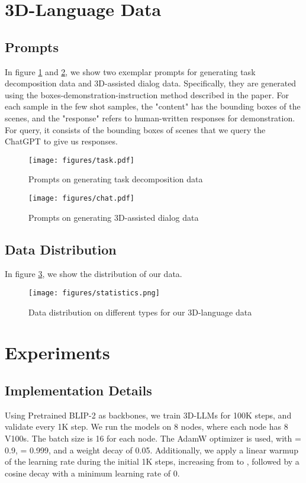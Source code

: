 
\appendix
\setcounter{section}{0}


\section{3D-Language Data}
\subsection{Prompts}
In figure \ref{fig:prompt1} and \ref{fig:prompt2}, we show two exemplar prompts for generating task decomposition data and 3D-assisted dialog data. Specifically, they are generated using the boxes-demonstration-instruction method described in the paper. For each sample in the few shot samples, the "content" has the bounding boxes of the scenes, and the "response" refers to human-written responses for demonstration. For query, it consists of the bounding boxes of scenes that we query the ChatGPT to give us responses. 
\begin{figure}[htbp]
    \centering
    \vspace{-2em}
    \texttt{[image: figures/task.pdf]}
    \caption{Prompts on generating task decomposition data}
    \label{fig:prompt1}
    \vspace{-2em}
\end{figure}
\begin{figure}[htbp]
    \centering
    \texttt{[image: figures/chat.pdf]}
    \caption{Prompts on generating 3D-assisted dialog data}
    \label{fig:prompt2}
\end{figure}

\subsection{Data Distribution}
In figure \ref{fig:data}, we show the distribution of our data.
\begin{figure}[htbp]
    \centering
    \texttt{[image: figures/statistics.png]}
    \caption{Data distribution on different types for our 3D-language data}
    \label{fig:data}
\end{figure}

\section{Experiments}
\subsection{Implementation Details}
Using Pretrained BLIP-2 as backbones, we train 3D-LLMs for 100K steps, and validate every 1K step. We run the models on 8 nodes, where each node has 8 V100s. The batch size is 16 for each node.  The AdamW optimizer is used, with  = 0.9,
 = 0.999, and a weight decay of 0.05. Additionally, we apply a linear warmup of the learning
rate during the initial 1K steps, increasing from  to , followed by a cosine decay with a minimum learning rate of 0.

